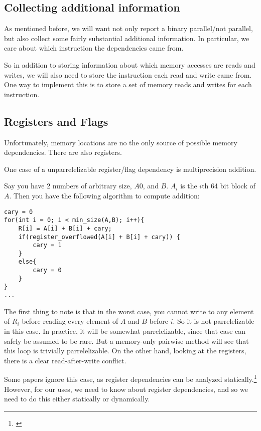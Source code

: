 \documentclass[12pt,twoside]{reedthesis}
\begin{document}
		\subsection{Collecting additional information}

		As mentioned before, we will want not only report a binary parallel/not parallel, but also collect some fairly substantial additional information. In particular, we care about which instruction the dependencies came from.

		So in addition to storing information about which memory accesses are reads and writes, we will also need to store the instruction each read and write came from. One way to implement this is to store a set of memory reads and writes for each instruction.

		\subsection{Registers and Flags}
		Unfortunately, memory locations are no the only source of possible memory dependencies. There are also registers.


		One case of a unparrelelizable register/flag dependency is multiprecision addition.

		Say you have 2 numbers of arbitrary size, $A0$, and $B$. $A_i$ is the $i$th 64 bit block of $A$. Then you have the following algorithm to compute addition:

		\begin{lstlisting}
cary = 0
for(int i = 0; i < min_size(A,B); i++){
	R[i] = A[i] + B[i] + cary;
	if(register_overflowed(A[i] + B[i] + cary)) {
		cary = 1
	}
	else{
		cary = 0
	}
}
...
		\end{lstlisting}

		The first thing to note is that in the worst case, you cannot write to any element of $R_i$ before reading every element of $A$ and $B$ before $i$. So it is not parrelelizable in this case. In practice, it will be somewhat parrelelizable, since that case can safely be assumed to be rare. But a memory-only pairwise method will see that this loop is trivially parrelelizable. On the other hand, looking at the registers, there is a clear read-after-write conflict.

		Some papers ignore this case, as register dependencies can be analyzed statically.\footnote{\cite{Chen:2004}} However, for our uses, we need to know about register dependencies, and so we need to do this either statically or dynamically.
\end{document}
